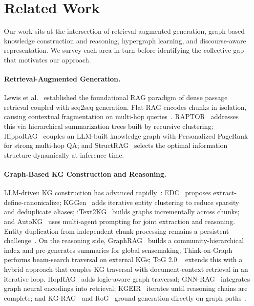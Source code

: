 \documentclass[runningheads]{llncs}
\begin{document}
\section{Related Work}

Our work sits at the intersection of retrieval-augmented generation, graph-based knowledge
construction and reasoning, hypergraph learning, and discourse-aware representation. We
survey each area in turn before identifying the collective gap that motivates our approach.

\paragraph{Retrieval-Augmented Generation.}
Lewis et al.~\cite{lewis2020retrieval} established the foundational RAG paradigm of dense passage
retrieval coupled with seq2seq generation.
Flat RAG encodes chunks in isolation, causing contextual fragmentation on multi-hop
queries~\cite{peng2025graph,zhu2026graph}.
RAPTOR~\cite{sarthi2024raptor} addresses this via hierarchical summarization trees built by
recursive clustering; HippoRAG~\cite{gutierrez2024hipporag} couples an LLM-built knowledge
graph with Personalized PageRank for strong multi-hop QA; and
StructRAG~\cite{li2024structrag} selects the optimal information structure dynamically at
inference time.

\paragraph{Graph-Based KG Construction and Reasoning.}
LLM-driven KG construction has advanced rapidly~\cite{bian2025llm}: EDC~\cite{zhang2024extract}
proposes extract-define-canonicalize; KGGen~\cite{mo2025kggen} adds iterative entity
clustering to reduce sparsity and deduplicate aliases; iText2KG~\cite{lairgi2024itext2kg}
builds graphs incrementally across chunks; and AutoKG~\cite{zhu2024llms} uses multi-agent
prompting for joint extraction and reasoning.
Entity duplication from independent chunk processing remains a persistent
challenge~\cite{chen2025large,meher2025link}.
On the reasoning side, GraphRAG~\cite{edge2024local} builds a community-hierarchical index
and pre-generates summaries for global sensemaking; Think-on-Graph ~\cite{sun2023think} performs beam-search traversal on external KGs; ToG 2.0 ~\cite{ma2024think} extends this with a hybrid approach that couples KG traversal with document-context retrieval in an iterative loop.
HopRAG~\cite{liu2025hoprag} adds logic-aware graph traversal; GNN-RAG~\cite{mavromatis2024gnn}
integrates graph neural encodings into retrieval; KGEIR~\cite{sun2025kgeir} iterates
until reasoning chains are complete; and KG-RAG~\cite{sanmartin2024kg} and
RoG~\cite{luo2023reasoning} ground generation directly on graph paths~\cite{chen2024llm}.
\end{document}
